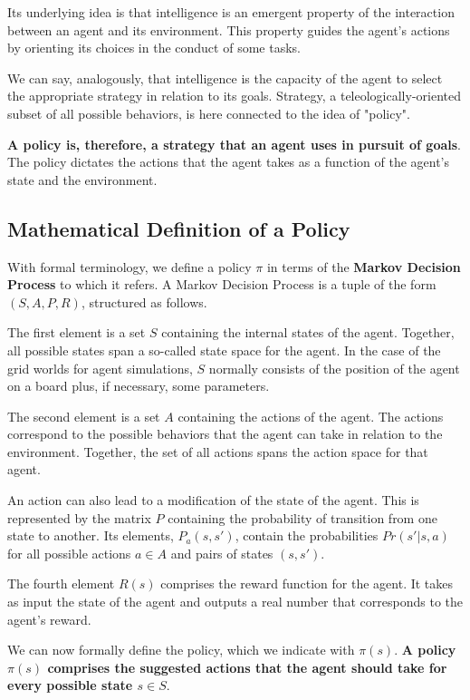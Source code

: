 Its underlying idea is that intelligence is an emergent 
property of the interaction between an agent and its 
environment. This property guides the agent's actions by 
orienting its choices in the conduct of some tasks.

We can say, analogously, that intelligence is the capacity 
of the agent to select the appropriate strategy in relation 
to its goals. Strategy, a teleologically-oriented subset of 
all possible behaviors, is here connected to the idea of 
"policy".

{\bf A policy is, therefore, a strategy that an agent uses 
in pursuit of goals}. The policy dictates the actions that 
the agent takes as a function of the agent's state and the 
environment.

\subsection{Mathematical Definition of a Policy}

With formal terminology, we define a policy $\pi$ in terms 
of the {\bf Markov Decision Process} to which it refers. 
A Markov Decision Process is a tuple of the form 
$(S, A, P, R)$, structured as follows.

The first element is a set $S$ containing the internal 
states of the agent. Together, all possible states span a 
so-called state space for the agent. In the case of the grid 
worlds for agent simulations, $S$ normally consists of the 
position of the agent on a board plus, if necessary, some 
parameters.

The second element is a set $A$ containing the actions of 
the agent. The actions correspond to the possible behaviors 
that the agent can take in relation to the environment. 
Together, the set of all actions spans the action space for 
that agent.

An action can also lead to a modification of the state of 
the agent. This is represented by the matrix $P$ containing 
the probability of transition from one state to another. 
Its elements, $P_a(s,s')$, contain the probabilities 
$Pr(s' | s, a)$ for all possible actions $a\in A$ and pairs 
of states $(s, s')$.

The fourth element $R(s)$ comprises the reward function for 
the agent. It takes as input the state of the agent and 
outputs a real number that corresponds to the agent's reward.

We can now formally define the policy, which we indicate with 
$\pi(s)$. {\bf A policy $\pi(s)$ comprises the suggested 
actions that the agent should take for every possible 
state $s\in S$}.

